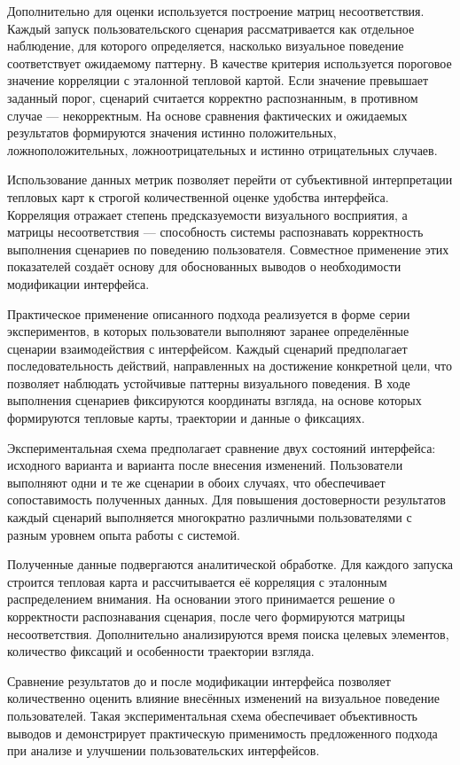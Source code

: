 \documentclass[12pt,a4paper]{article}
\begin{document}
Дополнительно для оценки используется построение матриц несоответствия.
Каждый запуск пользовательского сценария рассматривается как отдельное
наблюдение, для которого определяется, насколько визуальное поведение
соответствует ожидаемому паттерну. В качестве критерия используется
пороговое значение корреляции с эталонной тепловой картой. Если значение
превышает заданный порог, сценарий считается корректно распознанным,
в противном случае --- некорректным. На основе сравнения фактических
и ожидаемых результатов формируются значения истинно положительных,
ложноположительных, ложноотрицательных и истинно отрицательных случаев.

Использование данных метрик позволяет перейти от субъективной
интерпретации тепловых карт к строгой количественной оценке удобства
интерфейса. Корреляция отражает степень предсказуемости визуального
восприятия, а матрицы несоответствия --- способность системы распознавать
корректность выполнения сценариев по поведению пользователя.
Совместное применение этих показателей создаёт основу для обоснованных
выводов о необходимости модификации интерфейса.

Практическое применение описанного подхода реализуется в форме серии
экспериментов, в которых пользователи выполняют заранее определённые
сценарии взаимодействия с интерфейсом. Каждый сценарий предполагает
последовательность действий, направленных на достижение конкретной цели,
что позволяет наблюдать устойчивые паттерны визуального поведения.
В ходе выполнения сценариев фиксируются координаты взгляда, на основе
которых формируются тепловые карты, траектории и данные о фиксациях.

Экспериментальная схема предполагает сравнение двух состояний интерфейса:
исходного варианта и варианта после внесения изменений. Пользователи
выполняют одни и те же сценарии в обоих случаях, что обеспечивает
сопоставимость полученных данных. Для повышения достоверности результатов
каждый сценарий выполняется многократно различными пользователями
с разным уровнем опыта работы с системой.

Полученные данные подвергаются аналитической обработке. Для каждого
запуска строится тепловая карта и рассчитывается её корреляция
с эталонным распределением внимания. На основании этого принимается
решение о корректности распознавания сценария, после чего формируются
матрицы несоответствия. Дополнительно анализируются время поиска целевых
элементов, количество фиксаций и особенности траектории взгляда.

Сравнение результатов до и после модификации интерфейса позволяет
количественно оценить влияние внесённых изменений на визуальное
поведение пользователей. Такая экспериментальная схема обеспечивает
объективность выводов и демонстрирует практическую применимость
предложенного подхода при анализе и улучшении пользовательских
интерфейсов.
\end{document}
